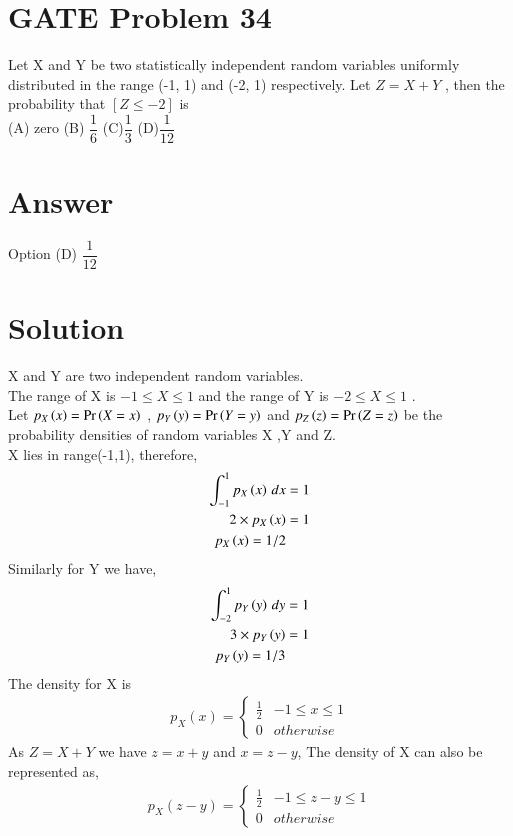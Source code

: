 \documentclass[journal,12pt,twocolumn]{IEEEtran}
\begin{document}
\section*{GATE Problem 34}
Let X and Y be two statistically independent random variables uniformly distributed in the range (-1, 1) and (-2, 1) respectively. Let $Z = X +Y$ , then the probability that $[Z \leq -2]$ is \\
(A) zero         \hfill  (B) $\dfrac{1}{6}$  \hfill
(C)$\dfrac{1}{3}$      \hfill       (D)$\dfrac{1}{12}$  
\section*{Answer}
Option (D) $\dfrac{1}{12}$
\section*{Solution}
X and Y are two independent random variables. \\
The range of X is $-1 \leq X \leq 1$ and the range of Y is $-2 \leq X \leq 1$ .\\ 
Let $ p_X\left(x\right) = \Pr\left(X=x\right)$ ,  $ p_Y\left(y\right) = \Pr\left(Y=y\right)$ and  $ p_Z\left(z\right) = \Pr\left(Z=z\right)$ be the probability densities of random variables X ,Y and Z. \\
X lies in range(-1,1), therefore,
\begin{align}
    \int_{-1}^{1} p_X\left(x\right) \,dx  &=1 \\
    2 \times p_X\left(x\right)  &= 1 \\
     p_X\left(x\right) =1 /2
\end{align}
Similarly for Y we have,
\begin{align}
    \int_{-2}^{1} p_Y\left(y\right) \,dy  &=1 \\
    3 \times p_Y\left(y\right)  &= 1  \\
     p_Y\left(y\right) =1 /3
\end{align}
The density for X is \\
\begin{align}
\label{eq:_pdf_x}
p_{X}(x)  = 
\begin{cases}
\frac{1}{2} & -1 \le x \le 1
\\
0 & otherwise
\end{cases}
\end{align}
As $Z= X+Y $ we have $z= x+ y$ and $x = z-y$,
The density of X can also be represented as,
\begin{align}
\label{eq:pdf_x}
p_{X}(z-y)  = 
\begin{cases}
\frac{1}{2} & -1 \le z-y \le 1
\\
0 & otherwise
\end{cases}
\end{align}
\end{document}

